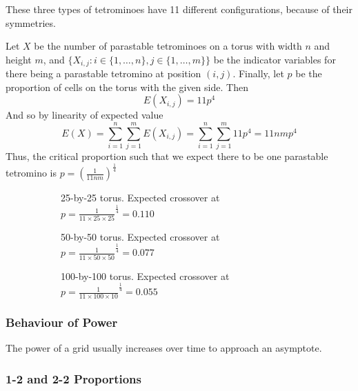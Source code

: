 \documentclass[12pt]{article}
\theoremstyle{definition}
\theoremstyle{remark}
\theoremstyle{remark}
\begin{document}
\par
These three types of tetrominoes have 11 different configurations, because of their symmetries.
\par
Let $X$ be the number of parastable tetrominoes on a torus with
width $n$ and height $m$, and $\{X_{i,j}:i\in\{1,\ldots,n\},j\in\{1,\ldots,m\}\}$
be the indicator variables for there being a parastable tetromino at
position $\left(i,j\right)$. Finally, let $p$ be the proportion of cells
on the torus with the given side. Then
\begin{equation}
	E(X_{i,j})=11p^4
	\end{equation}
And so by linearity of expected value
\begin{equation}
	E(X)=\sum_{i=1}^n \sum_{j=1}^m E(X_{i,j})=\sum_{i=1}^n \sum_{j=1}^m 11p^4 = 11nmp^4
\end{equation}
Thus, the critical proportion such that we expect there to be one
parastable tetromino is $p=\left(\frac{1}{11nm}\right)^{\frac{1}{4}}$

\begin{figure}[H]
  \centering
  \begin{subfigure}[b]{0.6\linewidth}
    \caption{25-by-25 torus. Expected crossover at ${p=\frac{1}{11\times25\times25}}^{\frac{1}{4}}=0.110$}
  \end{subfigure}
  \begin{subfigure}[b]{0.6\linewidth}
    \caption{50-by-50 torus. Expected crossover at ${p=\frac{1}{11\times50\times50}}^{\frac{1}{4}}=0.077$}
  \end{subfigure}
  \begin{subfigure}[b]{0.6\linewidth}
    \caption{100-by-100 torus. Expected crossover at ${p=\frac{1}{11\times100\times10}}^{\frac{1}{4}}=0.055$}
  \end{subfigure}
  \caption{}
\end{figure}

\subsubsection{Behaviour of Power} \label{Power}

The power of a grid usually increases over time to approach an asymptote. 

\subsubsection{1-2 and 2-2 Proportions} \label{LongTerm2P}
\end{document}
